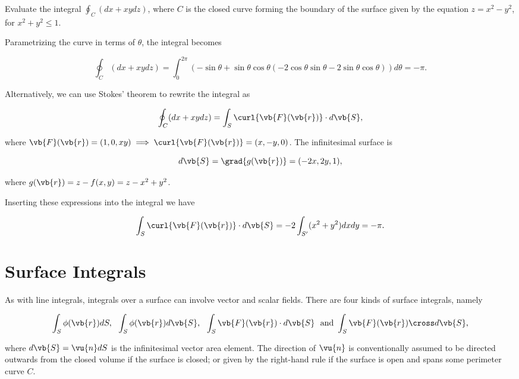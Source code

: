 \documentclass[english,a4paper,12pt]{report}
\begin{document}
{Evaluate the integral \(\oint_{C} (dx + xydz)\), where \(C\) is the closed curve forming the boundary of the surface given by the equation \(z = x^2 - y^2\), for \(x^2 + y^2 \le 1\).}
{Parametrizing the curve in terms of \(\theta \), the integral becomes 

\begin{equation}
	\oint_{C} (dx+xydz) = \int_{0}^{2\pi }(-\sin \theta +\sin \theta \cos \theta (-2\cos \theta \sin \theta -2\sin \theta \cos \theta ))d \theta = -\pi .  
\end{equation}

Alternatively, we can use Stokes' theorem to rewrite the integral as 

\begin{equation}
	\oint_{C} (dx+xydz) = \int_{S}^{} \curl{\vb{F} (\vb{r} )}\cdot d\vb{S} ,    
\end{equation}

where \(\vb{F} (\vb{r} ) = (1,0,xy) \implies \curl{\vb{F} (\vb{r} )} = (x,-y,0) \). The infinitesimal surface is 

\begin{equation}
	d\vb{S} = \grad{g(\vb{r} )} = (-2x,2y,1), 
\end{equation}

where \(g(\vb{r} ) = z - f(x,y) = z - x^2 + y^2\). 

Inserting these expressions into the integral we have

\begin{equation}
	\int_{S}^{} \curl{\vb{F} (\vb{r} )}\cdot d\vb{S} = -2 \int_{S'}^{} (x^2 + y^2)dxdy  = -\pi .  
\end{equation}

} 




\section{Surface Integrals}
As with line integrals, integrals over a surface can involve vector and scalar fields. There are four kinds of surface integrals, namely 

\begin{equation}
    \int_{S}^{} \phi(\vb{r}) dS,  ~~ \int_{S}^{} \phi(\vb{r}) d\vb{S} , ~~ \int_{S}^{} \vb{F}(\vb{r}) \cdot d\vb{S} ~ \text { and } \int_{S}^{} \vb{F}(\vb{r}) \cross d\vb{S},    
\end{equation}

where \(d\vb{S} = \vu{n} dS\) is the infinitesimal vector area element. The direction of \(\vu{n} \) is conventionally assumed to be directed outwards from the closed volume if the surface is closed; or given by the right-hand rule if the surface is open and spans some perimeter curve \(C\). 
\end{document}
